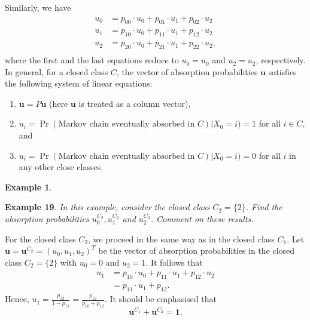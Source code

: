 \documentclass[
]{book}
\theoremstyle{definition}
\theoremstyle{definition}
\newtheorem{example}{Example}[chapter]
\theoremstyle{definition}
\theoremstyle{definition}
\theoremstyle{remark}
\begin{document}
Similarly, we have \[\begin{aligned}
    u_0 &= p_{00} \cdot u_0 + p_{01} \cdot  u_1 +  p_{02} \cdot  u_2 \\
    u_1 &= p_{10} \cdot  u_0 + p_{11} \cdot  u_1 + p_{12} \cdot  u_2  \\
    u_2 &= p_{20} \cdot  u_0 + p_{21} \cdot  u_1 + p_{22} \cdot  u_2,  \\\end{aligned}\]
where the first and the last equations reduce to \(u_0 = u_0\) and
\(u_2 = u_2\), respectively. In general, for a closed class \(C\), the
vector of absorption probabilities \(\mathbf{u}\) satisfies the following
system of linear equations:

\begin{enumerate}
\def\labelenumi{\arabic{enumi}.}
\item
  \(\mathbf{u} = P\mathbf{u}\) (here \(\mathbf{u}\) is treated as a column
  vector),
\item
  \(u_{i} = \Pr(\text{Markov chain eventually absorbed in } C) | X_0 = i) = 1\)
  for all \(i \in C\), and
\item
  \(u_{i} = \Pr(\text{Markov chain eventually absorbed in } C) | X_0 = i) = 0\)
  for all \(i\) in any other close classes.
\end{enumerate}

\begin{example}
\protect\hypertarget{exm:absorption}{}\label{exm:absorption}

\textbf{Example 19}. \emph{In this example, consider the closed class
\(C_2 = \{2\}\). Find the absorption probabilities \(u^{C_2}_0, u^{C_2}_1\)
and \(u^{C_2}_2\). Comment on these results.}

\end{example}

For the closed class \(C_2\), we proceed in the same way as in the closed
class \(C_1\). Let \(\mathbf{u}=\mathbf{u}^{C_{2}} = (u_0,u_1,u_2)^T\) be
the vector of absorption probabilities in the closed class \(C_{2}=\{2\}\)
with \(u_0 = 0\) and \(u_2 =1\). It follows that \[\begin{aligned}
    u_1 &=  p_{10} \cdot  u_0 + p_{11} \cdot  u_1 + p_{12} \cdot  u_2  \\
    &=  p_{11} \cdot  u_1 + p_{12}.\end{aligned}\] Hence,
\(u_1 = \frac{p_{12}}{1- p_{11}} =\frac{p_{12}}{p_{10}+ p_{12}}\). It
should be emphasised that
\[\mathbf{u}^{C_1} + \mathbf{u}^{C_2} = \mathbf{1} .\]
\end{document}
